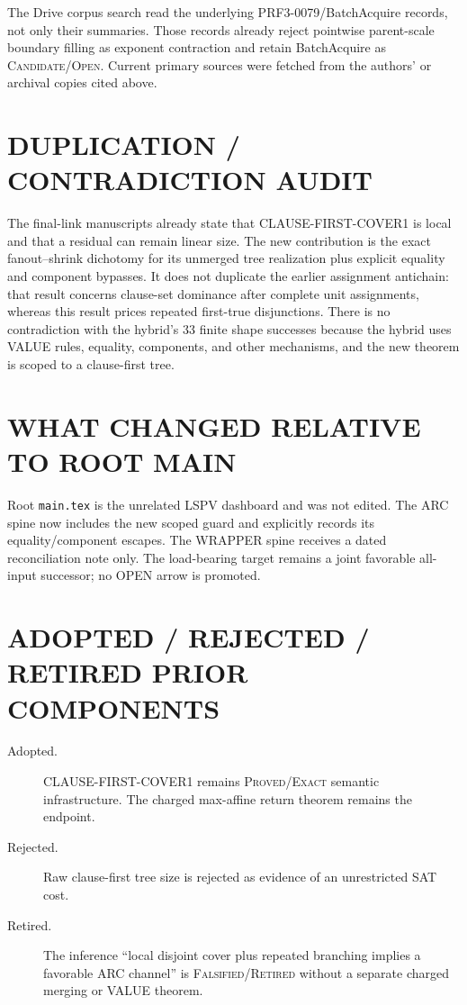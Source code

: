 \documentclass[11pt]{article}
\begin{document}
The Drive corpus search read the underlying PRF3-0079/BatchAcquire records,
not only their summaries.  Those records already reject pointwise
parent-scale boundary filling as exponent contraction and retain
BatchAcquire as \textsc{Candidate/Open}.  Current primary sources were fetched
from the authors' or archival copies cited above.

\section*{DUPLICATION / CONTRADICTION AUDIT}
The final-link manuscripts already state that CLAUSE-FIRST-COVER1 is local and
that a residual can remain linear size.  The new contribution is the exact
fanout--shrink dichotomy for its unmerged tree realization plus explicit
equality and component bypasses.  It does not duplicate the earlier assignment
antichain: that result concerns clause-set dominance after complete unit
assignments, whereas this result prices repeated first-true disjunctions.
There is no contradiction with the hybrid's 33 finite shape successes because
the hybrid uses VALUE rules, equality, components, and other mechanisms, and
the new theorem is scoped to a clause-first tree.

\section*{WHAT CHANGED RELATIVE TO ROOT MAIN}
Root \texttt{main.tex} is the unrelated LSPV dashboard and was not edited.
The ARC spine now includes the new scoped guard and explicitly records its
equality/component escapes.  The WRAPPER spine receives a dated reconciliation
note only.  The load-bearing target remains a joint favorable all-input
successor; no OPEN arrow is promoted.

\section*{ADOPTED / REJECTED / RETIRED PRIOR COMPONENTS}
\begin{description}
\item[Adopted.] CLAUSE-FIRST-COVER1 remains \textsc{Proved/Exact} semantic
infrastructure.  The charged max-affine return theorem remains the endpoint.
\item[Rejected.] Raw clause-first tree size is rejected as evidence of an
unrestricted SAT cost.
\item[Retired.] The inference ``local disjoint cover plus repeated branching
implies a favorable ARC channel'' is \textsc{Falsified/Retired} without a
separate charged merging or VALUE theorem.
\end{description}
\end{document}
